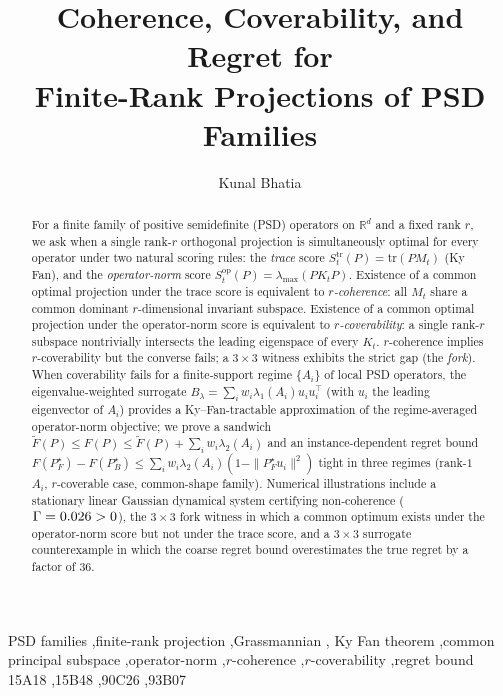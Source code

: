\documentclass[final,3p,times]{elsarticle}
\newcommand{\tr}{\mathrm{tr}}
\newcommand{\R}{\mathbb{R}}
\begin{document}
\begin{frontmatter}

\title{Coherence, Coverability, and Regret for\\
       Finite-Rank Projections of PSD Families}

\author{Kunal Bhatia}
\address{Independent Researcher, Heidelberg, Germany\\
ORCID: \href{https://orcid.org/0009-0007-4447-6325}{0009-0007-4447-6325}}

\begin{abstract}
For a finite family of positive semidefinite (PSD) operators on $\R^d$
and a fixed rank $r$, we ask when a single rank-$r$ orthogonal
projection is simultaneously optimal for every operator under two
natural scoring rules: the \emph{trace} score
$S^{\mathrm{tr}}_t(P)=\tr(P M_t)$ (Ky Fan), and the \emph{operator-norm}
score $S^{\mathrm{op}}_t(P)=\lambda_{\max}(P K_t P)$.
Existence of a common optimal projection under the trace score is
equivalent to \emph{$r$-coherence}: all $M_t$ share a common dominant
$r$-dimensional invariant subspace.
Existence of a common optimal projection under the operator-norm score
is equivalent to \emph{$r$-coverability}: a single rank-$r$ subspace
nontrivially intersects the leading eigenspace of every $K_t$.
$r$-coherence implies $r$-coverability but the converse fails; a
$3\times 3$ witness exhibits the strict gap (the \emph{fork}).
When coverability fails for a finite-support regime $\{A_i\}$ of local
PSD operators, the eigenvalue-weighted surrogate
$B_\lambda=\sum_i w_i\lambda_1(A_i)u_iu_i^\top$ (with $u_i$ the leading
eigenvector of $A_i$) provides a Ky--Fan-tractable approximation of the
regime-averaged operator-norm objective; we prove a sandwich
$\tilde F(P)\le F(P)\le\tilde F(P)+\sum_i w_i\lambda_2(A_i)$
and an instance-dependent regret bound
$F(P_F^\star)-F(P_B^\star)\le\sum_i w_i\lambda_2(A_i)(1-\|P_F^\star u_i\|^2)$
tight in three regimes (rank-$1$ $A_i$, $r$-coverable case,
common-shape family).
Numerical illustrations include a stationary linear Gaussian dynamical
system certifying non-coherence ($\Gamma=0.026>0$), the $3\times 3$
fork witness in which a common optimum exists under the operator-norm
score but not under the trace score, and a $3\times 3$ surrogate
counterexample in which the coarse regret bound overestimates the true
regret by a factor of $36$.
\end{abstract}

\begin{keyword}
PSD families \sep finite-rank projection \sep Grassmannian \sep
Ky Fan theorem \sep common principal subspace \sep operator-norm
\sep $r$-coherence \sep $r$-coverability \sep regret bound
\MSC[2020] 15A18 \sep 15B48 \sep 90C26 \sep 93B07
\end{keyword}

\end{frontmatter}
\end{document}
